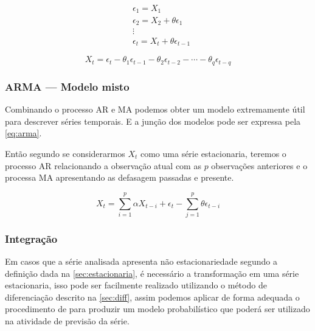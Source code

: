 \documentclass[
    12pt,
    oneside,
    a4paper,
    english,
    brazil
]{abntex2}
\begin{document}
\begin{equation} \label{eq:passeioAleatorio}
    \begin{split}
        & \epsilon_1 = X_1 \\
        & \epsilon_2 = X_2 + \theta \epsilon_1 \\
        & \vdots \\
        & \epsilon_t = X_t + \theta \epsilon_{t-1}
    \end{split}
\end{equation}

\begin{equation}
    \label{eq:pmediasmoveis}
    X_t = \epsilon_t - \theta_1\epsilon_{t-1} - \theta_2\epsilon_{t-2} - \cdots - \theta_{q}\epsilon_{t-q}
\end{equation}

\subsubsection{ARMA --- Modelo misto}

Combinando o  processo AR e MA  podemos obter um modelo  extremamente útil para
descrever  séries temporais.  E a  junção dos  modelos pode  ser expressa  pela
\autoref{eq:arma}.

Então segundo   se  considerarmos $X_t$  como uma
série estacionaria, teremos  o processo AR relacionando a  observação atual com
as  $p$  observações anteriores  e  o  processa  MA apresentando  as  defasagem
passadas e presente.

\begin{equation}
    \label{eq:arma}
    X_t = \sum_{i = 1}^{p}{\alpha X_{t-i}} + \epsilon_t - \sum_{j = 1}^{p}{\theta \epsilon_{t-i}}
\end{equation}

\subsubsection{Integração}

Em  casos  que a  série  analisada  apresenta  não estacionariedade  segundo  a
definição dada  na \autoref{sec:estacionaria}, é necessário  a transformação em
uma série estacionaria, isso pode  ser facilmente realizado utilizando o método
de  diferenciação  descrito na  \autoref{sec:diff},  assim  podemos aplicar  de
forma  adequada o  procedimento  de   para  produzir um  modelo
probabilístico que poderá ser utilizado na atividade de previsão da série.
\end{document}
